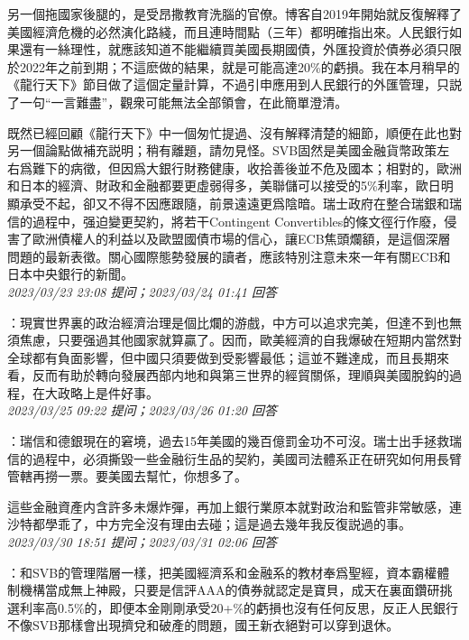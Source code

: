 \documentclass[twocolumn]{ctexart}
\begin{document}
另一個拖國家後腿的，是受昂撒教育洗腦的官僚。博客自2019年開始就反復解釋了美國經濟危機的必然演化路綫，而且連時間點（三年）都明確指出來。人民銀行如果還有一絲理性，就應該知道不能繼續買美國長期國債，外匯投資於債券必須只限於2022年之前到期；不這麽做的結果，就是可能高達20\%的虧損。我在本月稍早的《龍行天下》節目做了這個定量計算，不過引申應用到人民銀行的外匯管理，只説了一句“一言難盡”，觀衆可能無法全部領會，在此簡單澄清。

既然已經回顧《龍行天下》中一個匆忙提過、沒有解釋清楚的細節，順便在此也對另一個論點做補充説明；稍有離題，請勿見怪。SVB固然是美國金融貨幣政策左右爲難下的病徵，但因爲大銀行財務健康，收拾善後並不危及國本；相對的，歐洲和日本的經濟、財政和金融都要更虛弱得多，美聯儲可以接受的5\%利率，歐日明顯承受不起，卻又不得不因應跟隨，前景遠遠更爲陰暗。瑞士政府在整合瑞銀和瑞信的過程中，强迫變更契約，將若干Contingent Convertibles的條文徑行作廢，侵害了歐洲債權人的利益以及歐盟國債市場的信心，讓ECB焦頭爛額，是這個深層問題的最新表徵。關心國際態勢發展的讀者，應該特別注意未來一年有關ECB和日本中央銀行的新聞。
\\

\textit{\hfill\noindent\small 2023/03/23 23:08 提问；2023/03/24 01:41 回答}

：現實世界裏的政治經濟治理是個比爛的游戲，中方可以追求完美，但達不到也無須焦慮，只要强過其他國家就算贏了。因而，歐美經濟的自我爆破在短期内當然對全球都有負面影響，但中國只須要做到受影響最低；這並不難達成，而且長期來看，反而有助於轉向發展西部内地和與第三世界的經貿關係，理順與美國脫鈎的過程，在大政略上是件好事。
\\

\textit{\hfill\noindent\small 2023/03/25 09:22 提问；2023/03/26 01:20 回答}

：瑞信和德銀現在的窘境，過去15年美國的幾百億罰金功不可沒。瑞士出手拯救瑞信的過程中，必須撕毀一些金融衍生品的契約，美國司法體系正在研究如何用長臂管轄再撈一票。要美國去幫忙，你想多了。

這些金融資產内含許多未爆炸彈，再加上銀行業原本就對政治和監管非常敏感，連沙特都學乖了，中方完全沒有理由去碰；這是過去幾年我反復説過的事。
\\

\textit{\hfill\noindent\small 2023/03/30 18:51 提问；2023/03/31 02:06 回答}

：和SVB的管理階層一樣，把美國經濟系和金融系的教材奉爲聖經，資本霸權體制機構當成無上神殿，只要是信評AAA的債券就認定是寶貝，成天在裏面鑽研挑選利率高0.5\%的，即便本金剛剛承受20+\%的虧損也沒有任何反思，反正人民銀行不像SVB那樣會出現擠兌和破產的問題，國王新衣絕對可以穿到退休。
\\
\end{document}
